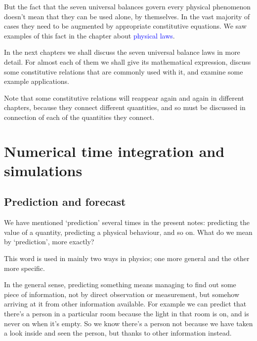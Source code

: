 \documentclass[a4paper,12pt,%
onecolumn,oneside,titlepage,%
british%
]{memoir}
\renewcommand*{\|}[1][]{\nonscript\:#1\vert\nonscript\:\mathopen{}}
\newcommand*{\sect}{\S}%
\renewcommand*{\autoref}[2]{\sidepar{\vspace{-1ex}\footnotesize{\color{blue}\faIcon{%
angle-right%
}\enspace\sect\,\ref{#1} page\,\pageref{#1}}}\textcolor{blue}{#2}}
\begin{document}
\smallskip


But the fact that the seven universal balances govern every physical phenomenon doesn't mean that they can be used alone, by themselves. In the vast majority of cases they need to be augmented by appropriate constitutive equations. We saw examples of this fact in the chapter about \autoref{cha:laws}{physical laws}.


\bigskip

In the next chapters we shall discuss the seven universal balance laws in more detail. For almost each of them we shall give its mathematical expression, discuss some constitutive relations that are commonly used with it, and examine some example applications.

Note that some constitutive relations will reappear again and again in different chapters, because they connect different quantities, and so must be discussed in connection of each of the quantities they connect.



\section{Numerical time integration and simulations}
\label{sec:numeric_simulation}


\subsection{Prediction and forecast}
\label{sec:forecast}

We have mentioned \enquote*{prediction} several times in the present notes: predicting the value of a quantity, predicting a physical behaviour, and so on. What do we mean by \enquote*{prediction}, more exactly?

This word is used in mainly two ways in physics; one more general and the other more specific.

In the general sense, predicting something means managing to find out some piece of information, not by direct observation or measurement, but somehow arriving at it from other information available. For example we can predict that there's a person in a particular room because the light in that room is on, and is never on when it's empty. So we know there's a person not because we have taken a look inside and seen the person, but thanks to other information instead.
\end{document}
